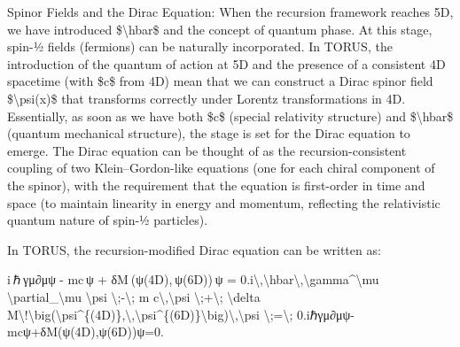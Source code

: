 \documentclass[
]{article}
\begin{document}
Spinor Fields and the Dirac Equation: When the recursion framework
reaches 5D, we have introduced \$\textbackslash hbar\$ and the concept
of quantum phase. At this stage, spin-½ fields (fermions) can be
naturally incorporated. In TORUS, the introduction of the quantum of
action at 5D and the presence of a consistent 4D spacetime (with \$c\$
from 4D) mean that we can construct a Dirac spinor field
\$\textbackslash psi(x)\$ that transforms correctly under Lorentz
transformations in 4D. Essentially, as soon as we have both \$c\$
(special relativity structure) and \$\textbackslash hbar\$ (quantum
mechanical structure), the stage is set for the Dirac equation to
emerge. The Dirac equation can be thought of as the recursion-consistent
coupling of two Klein--Gordon-like equations (one for each chiral
component of the spinor), with the requirement that the equation is
first-order in time and space (to maintain linearity in energy and
momentum, reflecting the relativistic quantum nature of spin-½
particles).

In TORUS, the recursion-modified Dirac equation can be written as:

i ℏ γμ∂μψ  -  mc ψ  +  δM ⁣(ψ(4D), ψ(6D)) ψ  =  0.i\textbackslash,\textbackslash hbar\textbackslash,\textbackslash gamma\^{}\textbackslash mu
\textbackslash partial\_\textbackslash mu \textbackslash psi
\textbackslash;-\textbackslash; m c\textbackslash,\textbackslash psi
\textbackslash;+\textbackslash; \textbackslash delta
M\textbackslash!\textbackslash big(\textbackslash psi\^{}\{(4D)\},\textbackslash,\textbackslash psi\^{}\{(6D)\}\textbackslash big)\textbackslash,\textbackslash psi
\textbackslash;=\textbackslash;
0.iℏγμ∂μ\hspace{0pt}ψ-mcψ+δM(ψ(4D),ψ(6D))ψ=0.
\end{document}
